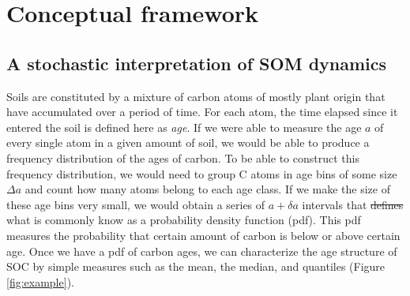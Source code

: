 \documentclass[draft,linenumbers]{agujournal}
\providecommand{\DIFadd}[1]{{\protect\color{blue}\uwave{#1}}} %
\providecommand{\DIFdel}[1]{{\protect\color{red}\sout{#1}}}                      %
\providecommand{\DIFaddbegin}{} %
\providecommand{\DIFaddend}{} %
\providecommand{\DIFdelbegin}{} %
\providecommand{\DIFdelend}{} %
\begin{document}
\section{Conceptual framework}

\subsection{A stochastic interpretation of SOM dynamics}
Soils are constituted by a mixture of carbon atoms of mostly plant origin that have accumulated over a period of time. 
For each atom, the time elapsed since it entered the soil is defined here as \emph{age}. If we were able to measure the age $a$ of every single atom in a given amount of soil, we would be able to produce a frequency distribution of the ages of carbon. To be able to construct this frequency distribution, we would need to group C atoms in age bins of some size $\Delta a$ and count how many atoms belong to each age class.  If we make the size of these age bins very small, we would obtain a series of $a + \delta a$ intervals that \DIFdelbegin \DIFdel{defines }\DIFdelend \DIFaddbegin \DIFadd{define }\DIFaddend what is commonly know as a probability density function (pdf). This pdf measures the probability that certain amount of carbon is below or above certain age. Once we have a pdf of carbon ages, we can characterize the age structure of SOC by simple measures such as the mean, the median, and quantiles (Figure \ref{fig:example}). 
\end{document}
